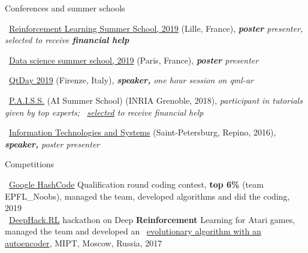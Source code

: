 \documentclass{resume} %
\newcommand{\mylink}{{\color{gray}\faExternalLink}}
\begin{document}
\begin{rSection}{Conferences and summer schools}
\vspace{-1em}
\item \mylink~\href{https://rlss.inria.fr}{Reinforcement Learning Summer School, 2019} (Lille, France){, \em {\bf poster} presenter, selected to receive {\bf financial help}}
\item \mylink~\href{https://ds3-datascience-polytechnique.fr}{Data science summer school, 2019} (Paris, France){, \em {\bf poster} presenter}
\item \mylink~\href{https://www.qtday.it/agenda/session/52811}{QtDay 2019} (Firenze, Italy){, \em {\bf speaker,} one hour session on qml-ar}
\item \mylink~\href{https://project.inria.fr/paiss/}{P.A.I.S.S.} (AI Summer School) (INRIA Grenoble, 2018){, \em participant in tutorials given by top experts; \mylink~\href{http://www.europe.naverlabs.com/Blog/Students-at-PAISS}{selected} to receive financial help }
\item \mylink~\href{http://iitp.ru/en/conferences/itas}{Information Technologies and Systems} (Saint-Petersburg, Repino, 2016){, \em {\bf speaker,} poster presenter}
\end{rSection}


\begin{rSection}{Competitions}
\vspace{-1em}
\item \mylink~\href{https://hashcodejudge.withgoogle.com/scoreboard}{Google HashCode} Qualification round coding contest, {\bf top 6\%} (team EPFL\_Noobs), managed the team, developed algorithms and did the coding, 2019\vspace{1em}\\
\mylink~\href{http://web.archive.org/web/20170224094223/http://rl.deephack.me/}{DeepHack.RL} hackathon on Deep {\bf Reinforcement} Learning for Atari games, managed the team and developed an \mylink~\href{https://github.com/sergeivolodin/deephack.rl}{evolutionary algorithm with an autoencoder}, MIPT, Moscow, Russia, 2017
\end{rSection}
\end{document}
